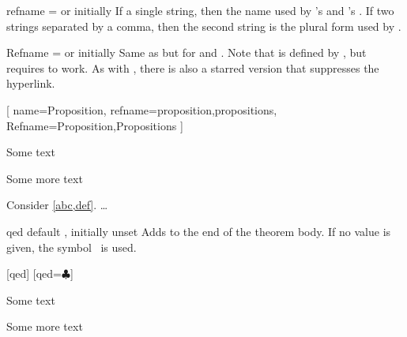 \documentclass{ltxdoc}
\begin{document}
\begin{docKey}{refname}
  {= \textrm{or} }
  {initially }
If a single string, then the name used by 's  and 's .
If two strings separated by a comma, then the second string is the plural form used by .
\end{docKey}

\begin{docKey}{Refname}
  {= \textrm{or} }
  {initially }
Same as  but for  and .
Note that  is defined by , but requires  to work.
As with , there is also a starred version  that suppresses the hyperlink.

\begin{tcbwritetemp}
[
  name=Proposition,
  refname={proposition,propositions},
  Refname={Proposition,Propositions}
  ]
\end{tcbwritetemp}

\begin{keythmscode}[withpreamble]
\begin{prop}[label=abc]
Some text
\end{prop}
\begin{prop}[label=def]
Some more text
\end{prop}
\begin{theorem}
Consider \cref{abc,def}.
 \dots
\end{theorem}
\end{keythmscode}

\end{docKey}

\begin{docKey}{qed}
  {}
  {default , initially unset}
Adds  to the end of the theorem body.
If no value is given, the symbol \openbox\ is used.

\begin{tcbwritetemp}
[qed]
[qed=$\clubsuit$]
\end{tcbwritetemp}

\begin{keythmscode}[withpreamble]
\begin{example}
Some text
\end{example}
\begin{solution}
Some more text
\end{solution}
\end{keythmscode}

\end{docKey}
\end{document}
